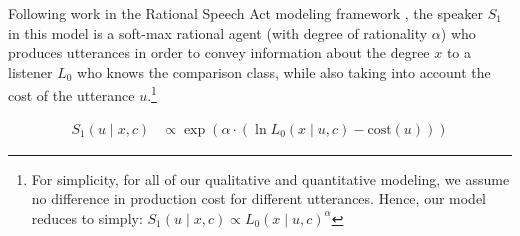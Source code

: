 \documentclass[doc]{apa6}
\newcommand{\ndg}[1]{\textcolor{Green}{[ndg: #1]}}
\begin{document}
Following work in the Rational Speech Act modeling framework \cite{Frank2012, Goodman2016, scontras2017probabilistic}, the speaker $S_1$ in this model is a soft-max rational agent (with degree of rationality $\alpha$) who produces utterances in order to convey information about the degree $x$ to a listener $L_0$ who knows the comparison class, while also taking into account the cost of the utterance $u$.\footnote{For simplicity, for all of our qualitative and quantitative modeling, we assume no difference in production cost for different utterances. Hence, our model reduces to simply: $S_1(u \mid x, c) \propto L_{0}(x \mid u, c)^{ \alpha}$}


\begin{align}
S_1(u \mid x, c) &\propto \exp{(\alpha \cdot (\ln L_{0}(x \mid u, c) - \text{cost}(u) ))}\label{eq:S1}
\end{align}





%
%
%
%
%
\end{document}
